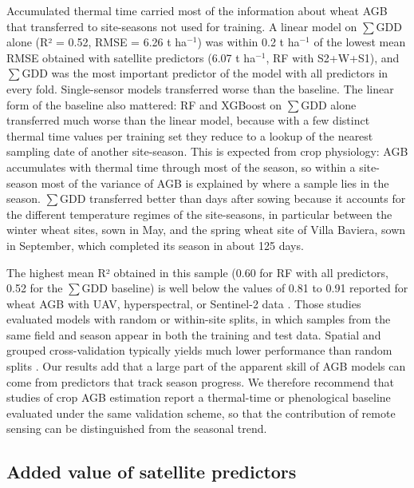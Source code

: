 \documentclass[
  british,
]{interact}
\begin{document}
Accumulated thermal time carried most of the information about wheat AGB
that transferred to site-seasons not used for training. A linear model
on \(\sum\)GDD alone (R² = 0.52, RMSE = 6.26 t ha\(^{-1}\)) was within
0.2 t ha\(^{-1}\) of the lowest mean RMSE obtained with satellite
predictors (6.07 t ha\(^{-1}\), RF with S2+W+S1), and \(\sum\)GDD was
the most important predictor of the model with all predictors in every
fold. Single-sensor models transferred worse than the baseline. The
linear form of the baseline also mattered: RF and XGBoost on \(\sum\)GDD
alone transferred much worse than the linear model, because with a few
distinct thermal time values per training set they reduce to a lookup of
the nearest sampling date of another site-season. This is expected from
crop physiology: AGB accumulates with thermal time through most of the
season, so within a site-season most of the variance of AGB is explained
by where a sample lies in the season. \(\sum\)GDD transferred better
than days after sowing because it accounts for the different temperature
regimes of the site-seasons, in particular between the winter wheat
sites, sown in May, and the spring wheat site of Villa Baviera, sown in
September, which completed its season in about 125 days.

The highest mean R² obtained in this sample (0.60 for RF with all
predictors, 0.52 for the \(\sum\)GDD baseline) is well below the values
of 0.81 to 0.91 reported for wheat AGB with UAV, hyperspectral, or
Sentinel-2 data \citep{AtkinsonAmorim2022, Liu2024, Marshall2022}. Those
studies evaluated models with random or within-site splits, in which
samples from the same field and season appear in both the training and
test data. Spatial and grouped cross-validation typically yields much
lower performance than random splits \citep{Ploton2020, Roberts2017}.
Our results add that a large part of the apparent skill of AGB models
can come from predictors that track season progress. We therefore
recommend that studies of crop AGB estimation report a thermal-time or
phenological baseline evaluated under the same validation scheme, so
that the contribution of remote sensing can be distinguished from the
seasonal trend.

\subsection{Added value of satellite
predictors}\label{added-value-of-satellite-predictors}
\end{document}
